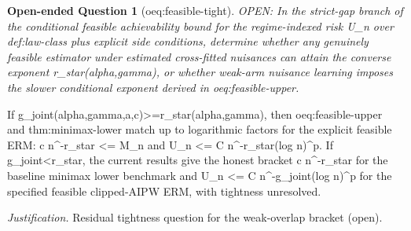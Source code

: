 \documentclass{article}
\newtheorem{openendedquestion}{Open-ended Question}
\begin{document}
\begin{openendedquestion}[oeq:feasible-tight]\label{oeq:feasible-tight}
OPEN: In the strict-gap branch of the conditional feasible achievability bound for the regime-indexed risk U_n over def:law-class plus explicit side conditions, determine whether any genuinely feasible estimator under estimated cross-fitted nuisances can attain the converse exponent r_star(alpha,gamma), or whether weak-arm nuisance learning imposes the slower conditional exponent derived in oeq:feasible-upper.
\end{openendedquestion}
If g_joint(alpha,gamma,a,c)>=r_star(alpha,gamma), then oeq:feasible-upper and thm:minimax-lower match up to logarithmic factors for the explicit feasible ERM: c n^{-r_star} <= M_n and U_n <= C n^{-r_star}(log n)^p. If g_joint<r_star, the current results give the honest bracket c n^{-r_star} for the baseline minimax lower benchmark and U_n <= C n^{-g_joint}(log n)^p for the specified feasible clipped-AIPW ERM, with tightness unresolved.
\par\smallskip\noindent \textit{Justification.} Residual tightness question for the weak-overlap bracket (open).
\end{document}
